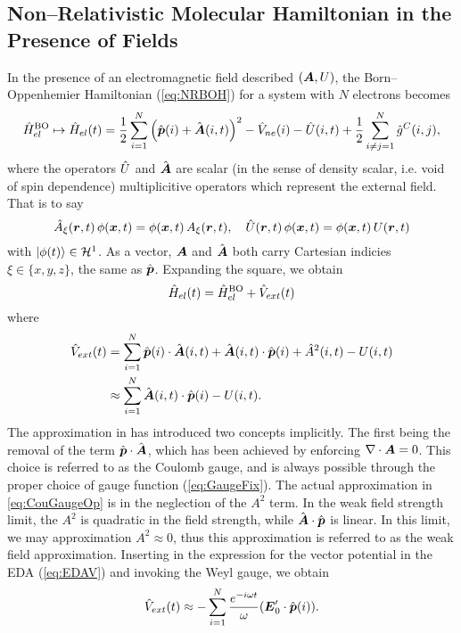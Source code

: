 \subsection{Non--Relativistic Molecular Hamiltonian in the Presence of Fields}

In the presence of an electromagnetic field described $(\boldsymbol{A},U)$, the
Born--Oppenhemier Hamiltonian (\cref{eq:NRBOH}) for a system with $N$ electrons
becomes
\begin{equation}
\hat{H}^\mathrm{BO}_{el} \mapsto \hat{H}_{el}(t) = 
  \frac{1}{2} \sum_{i=1}^N \left( \hat{\boldsymbol{p}}(i) + \hat{\boldsymbol{A}}(i,t) \right)^2 - 
  \hat{V}_{ne}(i) - \hat{U}(i , t) + \frac{1}{2}\sum_{i\neq j = 1}^N \hat{g}^C(i,j),
\end{equation}
where the operators $\hat{U}$ and $\hat{\boldsymbol{A}}$ are scalar (in the sense of density scalar,
i.e. void of spin dependence) multiplicitive operators which represent the external field.
That is to say
\begin{equation}
\hat{A}_\xi(\boldsymbol{r} , t )\, \phi(\boldsymbol{x}, t )  = \phi(\boldsymbol{x}, t ) \,A_\xi(\boldsymbol{r}, t) , \quad \hat{U}(\boldsymbol{r} , t) \,\phi(\boldsymbol{x}, t ) = \phi(\boldsymbol{x}, t ) \,U(\boldsymbol{r}, t)
\end{equation}
with $\left\vert \phi (t) \right\rangle \in \mathcal{H}^1$.
As a vector, $\boldsymbol{A}$ and $\hat{\boldsymbol{A}}$ both carry Cartesian indicies $\xi\in \{x,y,z\}$, the same as
$\hat{\boldsymbol{p}}$.
Expanding the square, we obtain
\begin{equation}
\hat{H}_{el}(t) = \hat{H}^\mathrm{BO}_{el} + \hat{V}_{ext}(t)
\end{equation}
where
\begin{align}
\hat{V}_{ext}(t) &= \sum_{i=1}^N \hat{\boldsymbol{p}}(i) \cdot \hat{\boldsymbol{A}}(i , t) + \hat{\boldsymbol{A}}(i , t) \cdot \hat{\boldsymbol{p}}(i) + \hat{A}^2(i, t) - 
  U(i , t) \nonumber \\
  &\approx \sum_{i=1}^N  \hat{\boldsymbol{A}}(i , t) \cdot \hat{\boldsymbol{p}}(i) - U(i , t). \label{eq:CouGaugeOp}
\end{align}
The approximation in  has introduced two concepts implicitly. The first being the removal of the term 
$\hat{\boldsymbol{p}} \cdot \hat{\boldsymbol{A}}$, which has been achieved by enforcing $\nabla \cdot \boldsymbol{A} = 0$. This choice is referred
to as the Coulomb gauge, and is always possible through the proper choice of gauge function (\cref{eq:GaugeFix}). The
actual approximation in \cref{eq:CouGaugeOp} is in the neglection of the $A^2$ term. In the weak field strength limit,
the $A^2$ is quadratic in the field strength, while $\hat{\boldsymbol{A}} \cdot \hat{\boldsymbol{p}}$ is linear. In this limit, we may 
approximation $A^2 \approx 0$, thus this approximation is referred to as the weak field approximation.
Inserting in the expression for the vector potential in the EDA (\cref{eq:EDAV}) and invoking the Weyl gauge, 
we obtain
\begin{equation}
\label{eq:VextVel}
\hat{V}_{ext}(t) \approx -\sum_{i=1}^N \frac{e^{-i\omega t}}{\omega} ( \boldsymbol{E}'_0 \cdot \hat{\boldsymbol{p}}(i) ).
\end{equation}

